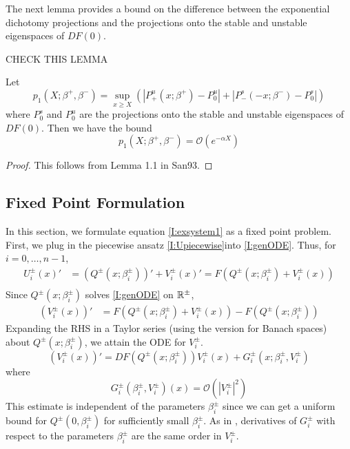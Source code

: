 \documentclass[thesis.tex]{subfiles}
\begin{document}
The next lemma provides a bound on the difference between the exponential dichotomy projections and the projections onto the stable and unstable eigenspaces of $DF(0)$.

CHECK THIS LEMMA
\begin{lemma}\label{p1}
Let 
\begin{equation}
p_1(X; \beta^+, \beta^-) = \sup_{x \geq X} (|P^u_+(x; \beta^+) - P_0^u| + |P^s_-(-x; \beta^-) - P_0^s|)
\end{equation}
where $P_0^s$ and $P_0^u$ are the projections onto the stable and unstable eigenspaces of $DF(0)$. Then we have the bound
\begin{equation}
p_1(X; \beta^+, \beta^-) = \mathcal{O}(e^{-\alpha X})
\end{equation} 
\begin{proof}
This follows from Lemma 1.1 in San93.
\end{proof}
\end{lemma}

\subsection{Fixed Point Formulation}

In this section, we formulate equation \eqref{I:exsystem1} as a fixed point problem. First, we plug in the piecewise ansatz \eqref{I:Upiecewise}into \eqref{I:genODE}. Thus, for $i = 0, \dots, n-1$, 
\begin{align*}
U_i^\pm(x)' &= (Q^\pm(x; \beta_i^\pm))' + V_i^\pm(x)' = F\left(Q^\pm(x; \beta_i^\pm) + V_i^\pm(x) \right) \\
\end{align*}
Since $Q^\pm(x; \beta_i^\pm)$ solves \eqref{I:genODE} on ${\mathbb R}^\pm$, 
\begin{align*}
(V_i^\pm(x))' &= F\left(Q^\pm(x; \beta_i^\pm) + V_i^\pm(x) \right) - F(Q^\pm(x; \beta_i^\pm))
\end{align*}
Expanding the RHS in a Taylor series (using the version for Banach spaces) about $Q^\pm(x; \beta_i^\pm)$, we attain the ODE for $V_i^\pm$.
\begin{equation}\label{Vpiecewise}
(V_i^\pm(x))' = DF(Q^\pm(x; \beta_i^\pm)) V_i^\pm(x) + G_i^\pm(x; \beta_i^\pm, V_i^\pm)
\end{equation}
where 
\begin{equation}\label{Gquadratic}
G_i^\pm(\beta_i^\pm, V_i^\pm)(x) = \mathcal{O}(|V_i^\pm|^2)
\end{equation}
This estimate is independent of the parameters $\beta_i^\pm$ since we can get a uniform bound for $Q^\pm(0, \beta_i^\pm)$ for sufficiently small $\beta_i^\pm$. As in \cite{Sandstede1997}, derivatives of $G_i^\pm$ with respect to the parameters $\beta_i^\pm$ are the same order in $V_i^\pm$.
\end{document}
